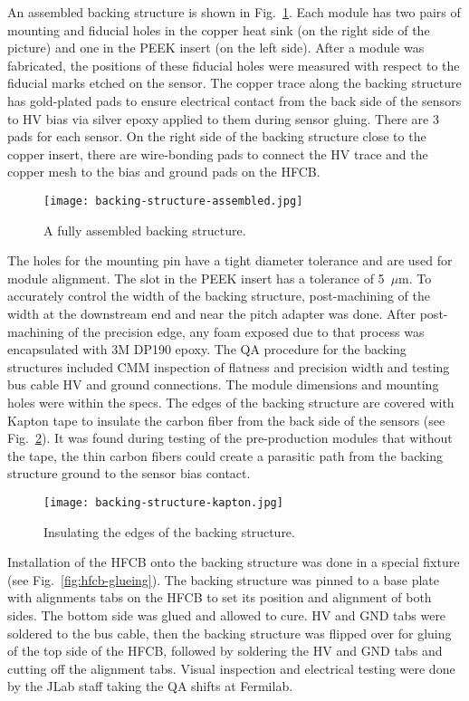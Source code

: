 An assembled backing structure is shown in Fig.~\ref{fig:backing-structure-assembled}. Each module has two pairs of mounting and fiducial holes in the copper heat sink (on the right side of the picture) and one in the PEEK insert (on the left side). After a module was fabricated, the positions of these fiducial holes were measured with respect to the fiducial marks etched on the sensor. The copper trace along the backing structure has gold-plated pads to ensure electrical contact from the back side of the sensors to HV bias via silver epoxy applied to them during sensor gluing. There are 3 pads for each sensor. On the right side of the backing structure close to the copper insert, there are wire-bonding pads to connect the HV trace and the copper mesh to the bias and ground pads on the HFCB.

\begin{figure}[hbt] 
\centering 
\texttt{[image: backing-structure-assembled.jpg]}
\caption{A fully assembled backing structure.}
\label{fig:backing-structure-assembled}
\end{figure}

The holes for the mounting pin have a tight diameter tolerance and are used for module alignment. The slot in the PEEK insert has a tolerance of 5~$\mu$m. To accurately control the width of the backing structure, post-machining of the width at the downstream end and near the pitch adapter was done. After post-machining of the precision edge, any foam exposed due to that process was encapsulated with 3M DP190 epoxy. The QA procedure for the backing structures included CMM inspection of flatness and precision width and testing bus cable HV and ground connections. The module dimensions and mounting holes were within the specs. The edges of the backing structure are covered with Kapton tape to insulate the carbon fiber from the back side of the sensors (see Fig.~\ref{fig:backing-structure-kapton}). It was found during testing of the pre-production modules that without the tape, the thin carbon fibers could create a parasitic path from the backing structure ground to the sensor bias contact.

\begin{figure}[hbt] 
\centering 
\texttt{[image: backing-structure-kapton.jpg]}
\caption{Insulating the edges of the backing structure.}
\label{fig:backing-structure-kapton}
\end{figure}

Installation of the HFCB onto the backing structure was done in a special fixture (see Fig.~\ref{fig:hfcb-glueing}). The backing structure was pinned to a base plate with alignments tabs on the HFCB to set its position and alignment of both sides. The bottom side was glued and allowed to cure. HV and GND tabs were soldered to the bus cable, then the backing structure was flipped over for gluing of the top side of the HFCB, followed by soldering the HV and GND tabs and cutting off the alignment tabs. Visual inspection and electrical testing were done by the JLab staff taking the QA shifts at Fermilab.

